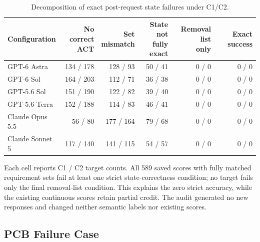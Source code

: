 \documentclass{article} %
\begin{document}
\begin{table}[htbp]
\caption{Decomposition of exact post-request state failures under C1/C2.}
\label{tab:exact-state-failures}
\centering\normalsize
\setlength{\tabcolsep}{3pt}
\renewcommand{\arraystretch}{1.08}
\begin{tabular}{@{}lrrrrr@{}}
\toprule
Configuration & \shortstack[c]{No correct\\ACT} & \shortstack[c]{Set\\mismatch} & \shortstack[c]{State not\\fully exact} & \shortstack[c]{Removal list\\only} & Exact success \\
\midrule
GPT-6 Astra & 134 / 178 & 128 / 93 & 50 / 41 & 0 / 0 & 0 / 0 \\
GPT-6 Sol & 164 / 203 & 112 / 71 & 36 / 38 & 0 / 0 & 0 / 0 \\
GPT-5.6 Sol & 151 / 190 & 122 / 82 & 39 / 40 & 0 / 0 & 0 / 0 \\
GPT-5.6 Terra & 152 / 188 & 114 / 83 & 46 / 41 & 0 / 0 & 0 / 0 \\
Claude Opus 5.5 & 56 / 80 & 177 / 164 & 79 / 68 & 0 / 0 & 0 / 0 \\
Claude Sonnet 5 & 117 / 140 & 141 / 115 & 54 / 57 & 0 / 0 & 0 / 0 \\
\bottomrule
\end{tabular}
\end{table}

Each cell reports C1 / C2 target counts. All 589 saved scores with fully matched requirement sets fail at least one strict state-correctness condition; no target fails only the final removal-list condition. This explains the zero strict accuracy, while the existing continuous scores retain partial credit. The audit generated no new responses and changed neither semantic labels nor existing scores.

\FloatBarrier
\subsection{PCB Failure Case}
\label{app:e3}
\end{document}
